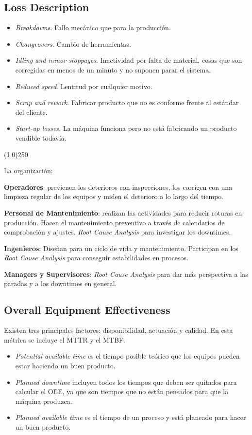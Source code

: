 \documentclass[oneside]{book}
\begin{document}
\subsection{Loss Description}

\begin{itemize}
	\item \textit{Breakdowns}. Fallo mecánico que para la producción.
	\item \textit{Changeovers}. Cambio de herramientas.
	\item \textit{Idling and minor stoppages}. Inactividad por falta de material, cosas que son corregidas en menos de un minuto y no suponen parar el sistema.
	\item \textit{Reduced speed}. Lentitud por cualquier motivo.
	\item \textit{Scrap and rework}. Fabricar producto que no es conforme frente al estándar del cliente.
	\item \textit{Start-up losses}. La máquina funciona pero no está fabricando un producto vendible todavía.
\end{itemize}

\begin{center}
	\line(1,0){250}
\end{center}


La organización:

\textbf{Operadores}: previenen los deterioros con inspecciones, los corrigen con una limpieza regular de los equipos y miden el deterioro a lo largo del tiempo.

\textbf{Personal de Mantenimiento}: realizan las actividades para reducir roturas en producción. Hacen el mantenimiento preventivo a través de calendarios de comprobación y ajustes. \textit{Root Cause Analysis} para investigar los downtimes.

\textbf{Ingenieros}: Diseñan para un ciclo de vida y mantenimiento. Participan en los \textit{Root Cause Analysis} para conseguir estabilidades en procesos.

\textbf{Managers y Supervisores}: \textit{Root Cause Analysis} para dar más perspectiva a las paradas y a los downtimes en general.

\subsection{Overall Equipment Effectiveness}

Existen tres principales factores: disponibilidad, actuación y calidad. En esta métrica se incluye el MTTR y el MTBF.
\begin{itemize}
	\item \textit{Potential available time} es el tiempo posible teórico que los equipos pueden estar haciendo un buen producto.
	\item \textit{Planned downtime} incluyen todos los tiempos que deben ser quitados para calcular el OEE, ya que son tiempos que no están pensados para que la máquina produzca.
	\item \textit{Planned available time} es el tiempo de un proceso y está planeado para hacer un buen producto.
\end{itemize}
\end{document}
